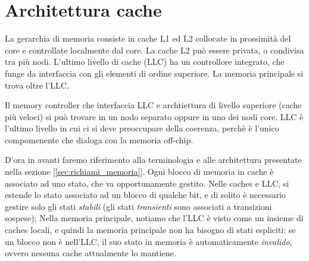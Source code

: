 \section{Architettura cache}
La gerarchia di memoria consiste in cache L1 ed L2 collocate in prossimità del core e controllate localmente dal core. La cache L2 può essere privata, o condivisa tra più nodi. L'ultimo livello di cache (LLC) ha un controllore integrato, che funge da interfaccia con gli elementi di ordine superiore. La memoria principale si trova oltre l'LLC. 

\begin{figure}[ht]
    \centering
    \setlength{\fboxrule}{0.5pt} %
    \setlength{\fboxsep}{0pt}    %
\end{figure}

\begin{info}
    Il memory controller che interfaccia LLC e archtiettura di livello superiore (cache più veloci) si può trovare in un nodo separato oppure in uno dei nodi core. LLC è l'ultimo livello in cui ci si deve preoccupare della coerenza, perchè è l'unico compomenente che dialoga con la memoria off-chip.
\end{info}

D'ora in avanti faremo riferimento alla terminologia e alle architettura presentate nella sezione [\ref{sec:richiami_memoria}]. Ogni blocco di memoria in cache è associato ad uno stato, che va opportunamente gestito. Nelle caches e LLC, si estende lo stato associato ad un blocco di qualche bit, e di solito è necessario gestire solo gli stati \textit{stabili} (gli stati \textit{transienti} sono associati a transizioni sospese); Nella memoria principale, notiamo che l'LLC è visto come un insieme di caches locali, e quindi la memoria principale non ha bisogno di stati espliciti: se un blocco non è nell'LLC, il suo stato in memoria è automaticamente \textit{invalido}, ovvero nessuna cache attualmente lo mantiene. 

